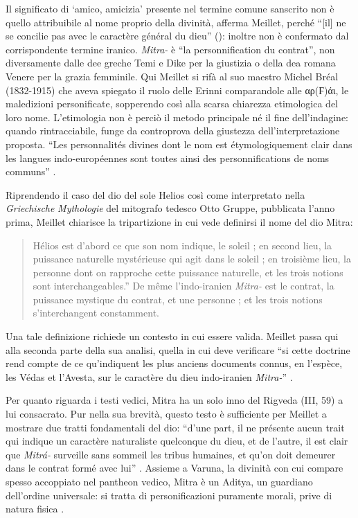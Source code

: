 \documentclass[output=paper]{langsci/langscibook}
\begin{document}
Il significato di ‘amico, amicizia’ presente nel termine comune sanscrito non è quello attribuibile al nome proprio della divinità, afferma Meillet, perché “[il] ne se concilie pas avec le caractère général du dieu” (\citealt[145]{meillet_dieu_1907-1}): inoltre non è confermato dal corrispondente termine iranico. \textit{Mitra-} è “la personnification du contrat”, non diversamente dalle dee greche Temi e Dike per la giustizia o della dea romana Venere per la grazia femminile. Qui Meillet si rifà al suo maestro Michel Bréal (1832-1915) che aveva spiegato il ruolo delle Erinni comparandole alle αρ(Ϝ)άι, le maledizioni personificate, sopperendo così alla scarsa chiarezza etimologica del loro nome. L’etimologia non è perciò il metodo principale né il fine dell’indagine: quando rintracciabile, funge da controprova della giustezza dell’interpretazione proposta. “Les personnalités divines dont le nom est étymologiquement clair dans les langues indo-européennes sont toutes ainsi des personnifications de noms communs” \citep[145-146]{meillet_dieu_1907-1}.

Riprendendo il caso del dio del sole Helios così come interpretato nella \textit{Griechische} \textit{Mythologie} del mitografo tedesco Otto Gruppe, pubblicata l’anno prima, Meillet chiarisce la tripartizione in cui vede definirsi il nome del dio Mitra: 

\begin{quote}
    Hélios est d’abord ce que son nom indique, le soleil ; en second lieu, la puissance naturelle mystérieuse qui agit dans le soleil ; en troisième lieu, la personne dont on rapproche cette puissance naturelle, et les trois notions sont interchangeables.” De même l’indo-iranien \textit{Mitra-} est le contrat, la puissance mystique du contrat, et une personne ; et les trois notions s’interchangent constamment. \citep[146]{meillet_dieu_1907-1}
\end{quote}

Una tale definizione richiede un contesto in cui essere valida. Meillet passa qui alla seconda parte della sua analisi, quella in cui deve verificare “si cette doctrine rend compte de ce qu’indiquent les plus anciens documents connus, en l’espèce, les Védas et l’Avesta, sur le caractère du dieu indo-iranien \textit{Mitra-}” \citep[146]{meillet_dieu_1907-1}.

Per quanto riguarda i testi vedici, Mitra ha un solo inno del Rigveda (III, 59) a lui consacrato. Pur nella sua brevità, questo testo è sufficiente per Meillet a mostrare due tratti fondamentali del dio: “d’une part, il ne présente aucun trait qui indique un caractère naturaliste quelconque du dieu, et de l’autre, il est clair que \textit{Mitrá-} surveille sans sommeil les tribus humaines, et qu’on doit demeurer dans le contrat formé avec lui” \citep[147]{meillet_dieu_1907-1}. Assieme a Varuna, la divinità con cui compare spesso accoppiato nel pantheon vedico, Mitra è un Aditya, un guardiano dell’ordine universale: si tratta di personificazioni puramente morali, prive di natura fisica \citep[147]{meillet_dieu_1907-1}. 
\end{document}
